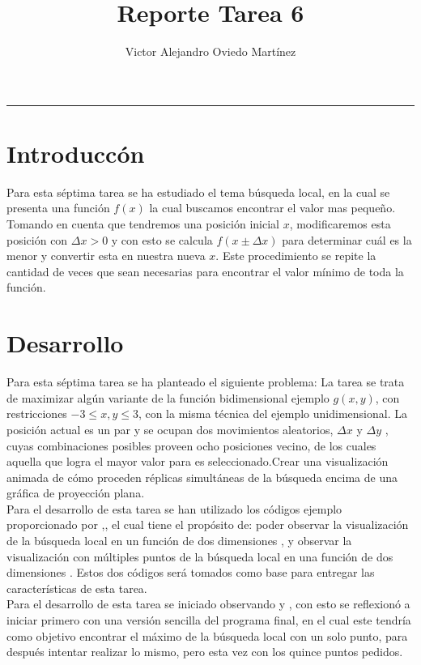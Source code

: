 \documentclass{article}
\title{Reporte Tarea 6}
\author{Victor Alejandro Oviedo Martínez}
\begin{document}
\maketitle
\hrule

\section{Introduccón}\label{intro}
Para esta séptima tarea\citep{DRA.P7} se ha estudiado el tema búsqueda local, en la cual se presenta una función $f(x)$ la cual buscamos encontrar el valor mas pequeño. Tomando en cuenta que tendremos una posición inicial $x$, modificaremos esta posición con $\Delta x > 0$ y con esto se calcula $f(x \pm \Delta x)$ para determinar cuál es la menor y convertir esta en nuestra nueva $x$. Este procedimiento se repite la cantidad de veces que sean necesarias para encontrar el valor mínimo de toda la función.




\section{Desarrollo}

Para esta séptima tarea se ha planteado el siguiente problema: La tarea se trata de maximizar algún variante de la función bidimensional ejemplo $g(x,y)$,  con restricciones $ -3\leq x,y \leq 3$, con la misma técnica del ejemplo unidimensional. La posición actual es un par y se ocupan dos movimientos aleatorios, $\Delta x$ y $\Delta y$ , cuyas combinaciones posibles proveen ocho posiciones vecino, de los cuales aquella que logra el mayor valor para es seleccionado.Crear una visualización animada de cómo proceden réplicas simultáneas de la búsqueda encima de una gráfica de proyección plana.\\

Para el desarrollo de esta tarea se han utilizado los códigos ejemplo proporcionado por \citet{DRA.Code},\citep{DRA.Code2}, el cual tiene el propósito de: poder observar la visualización de la búsqueda local en un función de dos dimensiones \citep{DRA.Code2}, y observar la visualización con múltiples puntos de la búsqueda local en una función de dos dimensiones \citep{DRA.Code}. Estos dos códigos será tomados como base para entregar las características de esta tarea.\\

Para el desarrollo de esta tarea se iniciado observando \citep{DRA.Code} y \citep{DRA.Code2}, con esto se reflexionó a iniciar primero con una versión sencilla del programa final, en el cual este tendría como objetivo encontrar el máximo de la búsqueda local con un solo punto, para después intentar realizar lo mismo, pero esta vez con los quince puntos pedidos.\\
\end{document}

